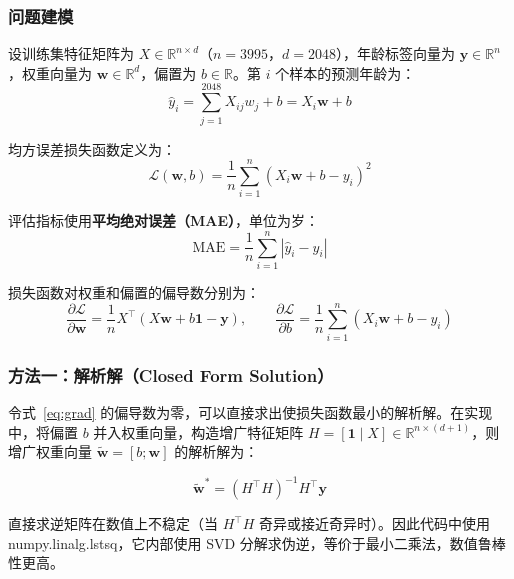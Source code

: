 \documentclass[12pt,a4paper]{ctexart}
\begin{document}
\subsubsection{问题建模}

设训练集特征矩阵为 $X \in \mathbb{R}^{n \times d}$（$n=3995$，$d=2048$），年龄标签向量为 $\mathbf{y} \in \mathbb{R}^{n}$，权重向量为 $\mathbf{w} \in \mathbb{R}^{d}$，偏置为 $b \in \mathbb{R}$。第 $i$ 个样本的预测年龄为：
\begin{equation}
  \hat{y}_i = \sum_{j=1}^{2048} X_{ij} w_j + b = X_i \mathbf{w} + b
  \label{eq:pred}
\end{equation}

均方误差损失函数定义为：
\begin{equation}
  \mathcal{L}(\mathbf{w}, b) = \frac{1}{n} \sum_{i=1}^{n} (X_i \mathbf{w} + b - y_i)^2
  \label{eq:loss}
\end{equation}

评估指标使用\textbf{平均绝对误差（MAE）}，单位为岁：
\begin{equation}
  \text{MAE} = \frac{1}{n} \sum_{i=1}^{n} |\hat{y}_i - y_i|
  \label{eq:mae}
\end{equation}

损失函数对权重和偏置的偏导数分别为：
\begin{equation}
  \frac{\partial \mathcal{L}}{\partial \mathbf{w}} = \frac{1}{n} X^\top (X\mathbf{w} + b\mathbf{1} - \mathbf{y}), \qquad
  \frac{\partial \mathcal{L}}{\partial b} = \frac{1}{n} \sum_{i=1}^{n} (X_i \mathbf{w} + b - y_i)
  \label{eq:grad}
\end{equation}

\subsubsection{方法一：解析解（Closed Form Solution）}

令式~\eqref{eq:grad} 的偏导数为零，可以直接求出使损失函数最小的解析解。在实现中，将偏置 $b$ 并入权重向量，构造增广特征矩阵 $H = [\mathbf{1} \mid X] \in \mathbb{R}^{n \times (d+1)}$，则增广权重向量 $\tilde{\mathbf{w}} = [b; \mathbf{w}]$ 的解析解为：

\begin{equation}
  \tilde{\mathbf{w}}^* = (H^\top H)^{-1} H^\top \mathbf{y}
  \label{eq:cfs}
\end{equation}

直接求逆矩阵在数值上不稳定（当 $H^\top H$ 奇异或接近奇异时）。因此代码中使用 numpy.linalg.lstsq，它内部使用 SVD 分解求伪逆，等价于最小二乘法，数值鲁棒性更高。
\end{document}
